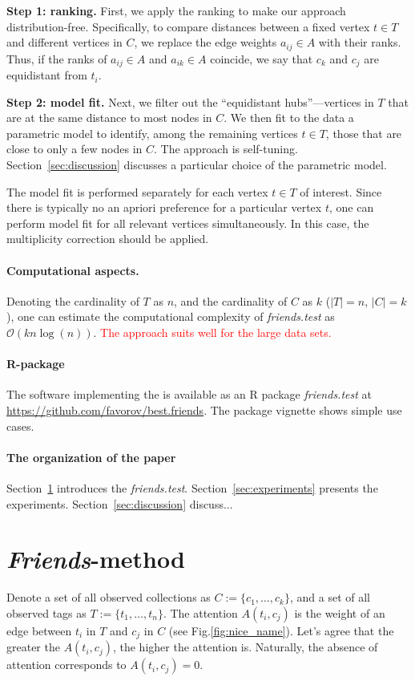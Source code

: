 \documentclass{llncs}
\begin{document}
\textbf{Step 1: ranking.} First, we apply the ranking to make our approach distribution-free. Specifically, to compare distances between a fixed vertex $t\in T$ and different vertices in $C$, we replace the edge weights $a_{ij} \in A$ with their ranks. Thus, if the ranks of $a_{ij} \in A$ and $a_{ik}\in A$ coincide, we say that $c_k$ and $c_j$ are equidistant from $t_i$.

\textbf{Step 2: model fit.} Next, we filter out the ``equidistant hubs''---vertices in $T$ that are at the same distance to most nodes in $C$. We then fit to the data a parametric model to identify, among the remaining vertices $t\in T$, those that are close to only a few nodes in $C$. The approach is self-tuning. Section~\ref{sec:discussion} discusses a particular choice of the parametric model.

The model fit is performed separately for each vertex $t\in T$ of interest. Since there is typically no an apriori preference for a particular vertex $t$, one can perform model fit for all relevant vertices simultaneously. In this case, the multiplicity correction should be applied. 

\paragraph{Computational aspects.} Denoting the cardinality of $T$ as $n$, and the cardinality of $C$ as $k$ ($|T| = n$, $|C| = k$), one can estimate the computational complexity of \textit{friends.test} as $\mathcal{O}(kn\log(n))$.
\textcolor{red}{The approach suits well for the large data sets.}

\paragraph{R-package}
The software implementing the  is available as an \textsf{R} package \textit{friends.test} at 
\url{https://github.com/favorov/best.friends}. The package vignette shows simple use cases.


\paragraph{The organization of the paper} Section~\ref{sec:method} introduces the \textit{friends.test}. Section~\ref{sec:experiments} presents the experiments. Section~\ref{sec:discussion} discuss...

\section{\textit{Friends}-method}
\label{sec:method}
Denote a set of all observed collections as $C := \{c_1, \dots, c_k\}$, and a set of all observed tags as $T := \{t_1, \dots, t_n\}$.
The attention $A(t_i, c_j)$ is the weight of an edge between $t_i$ in $ T$ and $c_j$ in $C$ (see Fig.\ref{fig:nice_name}).
Let's agree that the greater the $A(t_i, c_j)$, the higher the attention is. Naturally, the absence of attention corresponds to $A(t_i, c_j) = 0$. 
\end{document}
